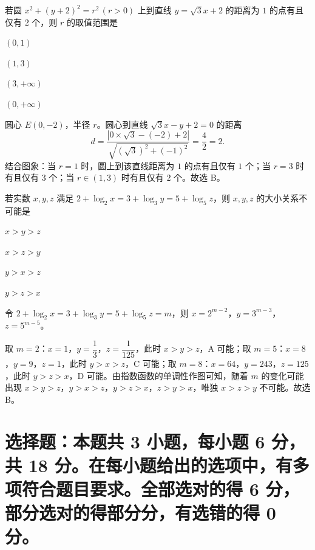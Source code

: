 \documentclass{exam-zh}
\begin{document}
\begin{question}
若圆 $x^{2}+(y+2)^{2}=r^{2}\,(r>0)$ 上到直线 $y=\sqrt{3}x+2$ 的距离为 $1$ 的点有且仅有 $2$ 个，则 $r$ 的取值范围是 \paren[B]
\begin{choices}
  \item $(0,1)$
  \item $(1,3)$
  \item $(3,+\infty)$
  \item $(0,+\infty)$
\end{choices}
\begin{solution}
圆心 $E(0,-2)$，半径 $r$。圆心到直线 $\sqrt{3}x-y+2=0$ 的距离
\[d=\frac{|0\times\sqrt{3}-(-2)+2|}{\sqrt{(\sqrt{3})^{2}+(-1)^{2}}}=\frac{4}{2}=2.\]
结合图象：当 $r=1$ 时，圆上到该直线距离为 $1$ 的点有且仅有 $1$ 个；当 $r=3$ 时有且仅有 $3$ 个；当 $r\in(1,3)$ 时有且仅有 $2$ 个。故选 B。
\end{solution}
\end{question}

\begin{question}
若实数 $x,y,z$ 满足 $2+\log_{2}x=3+\log_{3}y=5+\log_{5}z$，则 $x,y,z$ 的大小关系不可能是 \paren[B]
\begin{choices}
  \item $x>y>z$
  \item $x>z>y$
  \item $y>x>z$
  \item $y>z>x$
\end{choices}
\begin{solution}
令 $2+\log_{2}x=3+\log_{3}y=5+\log_{5}z=m$，则 $x=2^{m-2}$，$y=3^{m-3}$，$z=5^{m-5}$。

取 $m=2$：$x=1$，$y=\dfrac13$，$z=\dfrac1{125}$，此时 $x>y>z$，A 可能；取 $m=5$：$x=8$，$y=9$，$z=1$，此时 $y>x>z$，C 可能；取 $m=8$：$x=64$，$y=243$，$z=125$，此时 $y>z>x$，D 可能。由指数函数的单调性作图可知，随着 $m$ 的变化可能出现 $x>y>z$，$y>x>z$，$y>z>x$，$z>y>x$，唯独 $x>z>y$ 不可能。故选 B。
\end{solution}
\end{question}

\section{选择题：本题共 3 小题，每小题 6 分，共 18 分。在每小题给出的选项中，有多项符合题目要求。全部选对的得 6 分，部分选对的得部分分，有选错的得 0 分。}
\end{document}
